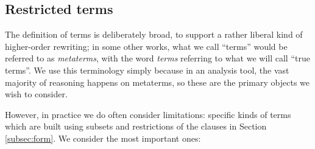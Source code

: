 \documentclass{lmcs}
\theoremstyle{theorem}\newtheorem{theorem}{Theorem}
\theoremstyle{theorem}\newtheorem{lemma}[theorem]{Lemma}
\theoremstyle{theorem}\newtheorem{corollary}[theorem]{Corollary}
\theoremstyle{definition}\newtheorem{definition}[theorem]{Definition}
\theoremstyle{definition}\newtheorem{example}[theorem]{Example}
\begin{document}
\subsection{Restricted terms}\label{subsec:termsets}

The definition of terms is deliberately broad, to support a rather liberal kind
of higher-order rewriting; in some other works, what we call ``terms'' would be
referred to as \emph{metaterms}, with the word \emph{terms} referring to what we
will call ``true terms''.  We use this terminology simply because in an analysis
tool, the vast majority of reasoning happens on metaterms, so these are the
primary objects we wish to consider.

However, in practice we do often consider limitations: specific kinds of terms
which are built using subsets and restrictions of the clauses in Section
\ref{subsec:form}.  We consider the most important ones:
\end{document}
